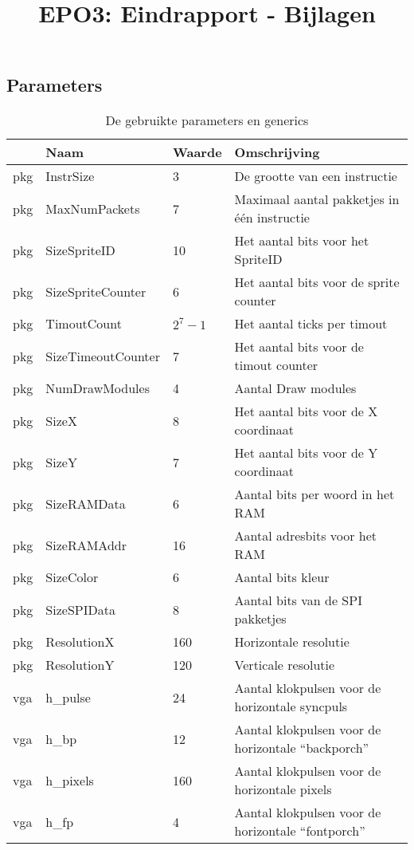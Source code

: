 \documentclass{scrreprt}
\author{}
\title{EPO3: Eindrapport - Bijlagen}
\begin{document}
\begin{appendices}
\renewcommand{\chapternumber}{\appendixname\space\thechapter} 
\chapter{Parameters}
\label{app:parameters}
\begin{table}[H]
	\centering
	\caption{De gebruikte parameters en generics}
	\label{tab:spec-params}
	\begin{tabular}{l l l p{}}
		\hline\hline
	 	 & Naam & Waarde & Omschrijving\\
	 	\hline
		pkg & InstrSize & 3 & De grootte van een instructie\\ 
		pkg & MaxNumPackets & 7 & Maximaal aantal pakketjes in één instructie\\ 
		pkg & SizeSpriteID & 10 & Het aantal bits voor het SpriteID \\
		pkg & SizeSpriteCounter & 6 & Het aantal bits voor de sprite counter\\
		pkg & TimoutCount & $2^{7}-1$ & Het aantal ticks per timout\\
		pkg & SizeTimeoutCounter & 7 & Het aantal bits voor de timout counter\\
		pkg & NumDrawModules & 4 & Aantal Draw modules\\ 
		pkg & SizeX & 8 & Het aantal bits voor de X coordinaat\\
		pkg & SizeY & 7 & Het aantal bits voor de Y coordinaat\\
		pkg & SizeRAMData & 6 & Aantal bits per woord in het RAM\\
		pkg & SizeRAMAddr & 16 & Aantal adresbits voor het RAM\\
		pkg & SizeColor & 6 & Aantal bits kleur\\
		pkg & SizeSPIData & 8 & Aantal bits van de SPI pakketjes\\
		pkg & ResolutionX & 160 & Horizontale resolutie \\
		pkg & ResolutionY & 120 & Verticale resolutie \\
		vga & h\_pulse & 24 & Aantal klokpulsen voor de horizontale syncpuls\\ 
		vga & h\_bp & 12 & Aantal klokpulsen voor de horizontale “backporch” \\ 
		vga & h\_pixels & 160 & Aantal klokpulsen voor de horizontale pixels \\ 
		vga & h\_fp & 4 & Aantal klokpulsen voor de horizontale “fontporch” \\ 

\end{tabular}
\end{table}
\end{appendices}
\end{document}

